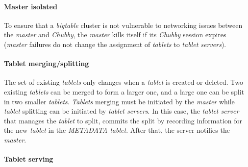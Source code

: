 \paragraph{Master isolated}
To ensure that a \emph{bigtable} cluster is not vulnerable to networking issues
between the \emph{master} and \emph{Chubby}, the \emph{master} kills itself if
its \emph{Chubby} session expires (\emph{master} failures do not change the
assignment of \emph{tablets} to \emph{tablet servers}).

\paragraph{Tablet merging/splitting}
The set of existing \emph{tablets} only changes when a \emph{tablet} is created
or deleted. Two existing \emph{tablets} can be merged to form a larger one, and
a large one can be split in two smaller \emph{tablets}. \emph{Tablets} merging
must be initiated by the \emph{master} while \emph{tablet} splitting can be
initiated by \emph{tablet servers}. In this case, the \emph{tablet server} that
manages the \emph{tablet} to split, commits the split by recording information
for the new \emph{tablet} in the \emph{METADATA tablet}. After that, the server
notifies the \emph{master}.

\paragraph{Tablet serving}\mbox{}


